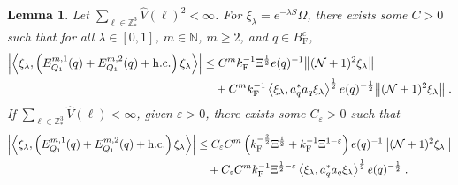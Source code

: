 \documentclass[12pt,a4paper]{article}
\numberwithin{equation}{section}
\newcommand{\NNN}{\mathbb{N}}
\newcommand{\1}{\mathbb{I}}
\newcommand{\F}{\mathrm{F}}
\newcommand{\Z}{\mathbb{Z}}
\newcommand{\NN}{\mathcal{N}}
\newcommand{\half}{\frac{1}{2}}
\newcommand{\eva}[1]{\left\langle #1 \right\rangle}
\theoremstyle{plain}
\newtheorem{lemma}[theorem]{Lemma}
\theoremstyle{definition}
\theoremstyle{remark}
\theoremstyle{plain}
\theoremstyle{definition}
\theoremstyle{remark}
\begin{document}
\begin{lemma} \label{lem:EQ111}
Let $ \sum_{\ell \in \Z^3_*} \hat{V}(\ell)^2 < \infty $. For $\xi_\lambda = e^{-\lambda S} \Omega$, there exists some $ C > 0 $ such that for all $ \lambda \in [0,1] $, $ m \in \NNN $, $ m \ge 2 $, and $ q \in B_{\F}^c $,
\begin{align} \label{eq:estEQ111_Coulomb}
	\abs{\eva{\xi_\lambda,\left(E^{m,1}_{Q_1}(q) + E^{m,2}_{Q_1}(q) + \mathrm{h.c.}\right) \xi_\lambda }} 
	&\leq C^m k_{\F}^{-1} \Xi^{\half} e(q)^{-1}
		\norm{ (\NN+1)^2 \xi_\lambda}  \nonumber\\
	&\quad + C^m k_{\F}^{-1} \eva{\xi_\lambda, a_q^* a_q \xi_\lambda}^{\half} e(q)^{-\half} \norm{(\NN+1)^2 \xi_\lambda} \;.
\end{align}
If $ \sum_{\ell \in \Z^3_*} \hat{V}(\ell) < \infty $, given $ \varepsilon > 0 $, there exists some $ C_\varepsilon > 0 $ such that
\begin{align} \label{eq:estEQ111}
	\abs{\eva{\xi_\lambda,\left(E^{m,1}_{Q_1}(q) + E^{m,2}_{Q_1}(q) + \mathrm{h.c.}\right) \xi_\lambda }} 
	&\leq C_\varepsilon C^m \left(
		k_{\F}^{-\frac{3}{2}} \Xi^\half
		+ k_{\F}^{-1}\Xi^{1-\varepsilon} \right) e(q)^{-1}
		\norm{ (\NN+1)^2 \xi_\lambda} \nonumber\\
	&\quad + C_\varepsilon C^m k_{\F}^{-1} \Xi^{\half - \varepsilon} \eva{\xi_\lambda, a_q^* a_q \xi_\lambda}^{\half} e(q)^{-\half} \;.
\end{align}
\end{lemma}
\end{document}
